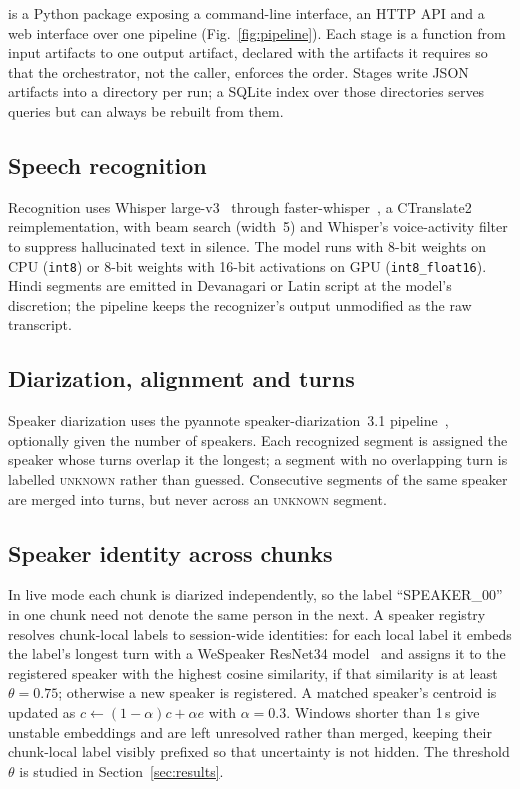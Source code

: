 \system{} is a Python package exposing a command-line interface, an HTTP API and
a web interface over one pipeline (Fig.~\ref{fig:pipeline}). Each stage is a
function from input artifacts to one output artifact, declared with the
artifacts it requires so that the orchestrator, not the caller, enforces the
order. Stages write JSON artifacts into a directory per run; a SQLite index over
those directories serves queries but can always be rebuilt from them.

\subsection{Speech recognition}
Recognition uses Whisper large-v3~\cite{radford2023whisper} through
faster-whisper~\cite{fasterwhisper}, a CTranslate2 reimplementation, with beam
search (width~5) and Whisper's voice-activity filter to suppress hallucinated
text in silence. The model runs with 8-bit weights on CPU (\texttt{int8}) or
8-bit weights with 16-bit activations on GPU (\texttt{int8\_float16}). Hindi
segments are emitted in Devanagari or Latin script at the model's discretion;
the pipeline keeps the recognizer's output unmodified as the raw transcript.

\subsection{Diarization, alignment and turns}
Speaker diarization uses the pyannote speaker-diarization~3.1
pipeline~\cite{bredin2023pyannote21,plaquet2023powerset}, optionally given the
number of speakers. Each recognized segment is assigned the speaker whose turns
overlap it the longest; a segment with no overlapping turn is labelled
\textsc{unknown} rather than guessed. Consecutive segments of the same speaker
are merged into turns, but never across an \textsc{unknown} segment.

\subsection{Speaker identity across chunks}
In live mode each chunk is diarized independently, so the label
``SPEAKER\_00'' in one chunk need not denote the same person in the next. A
speaker registry resolves chunk-local labels to session-wide identities: for
each local label it embeds the label's longest turn with a
WeSpeaker ResNet34 model~\cite{wang2023wespeaker} and assigns it to the
registered speaker with the highest cosine similarity, if that similarity is at
least $\theta=0.75$; otherwise a new speaker is registered. A matched speaker's
centroid is updated as $c \leftarrow (1-\alpha)c + \alpha e$ with $\alpha=0.3$.
Windows shorter than 1\,s give unstable embeddings and are left unresolved
rather than merged, keeping their chunk-local label visibly prefixed so that
uncertainty is not hidden. The threshold $\theta$ is studied in
Section~\ref{sec:results}.

